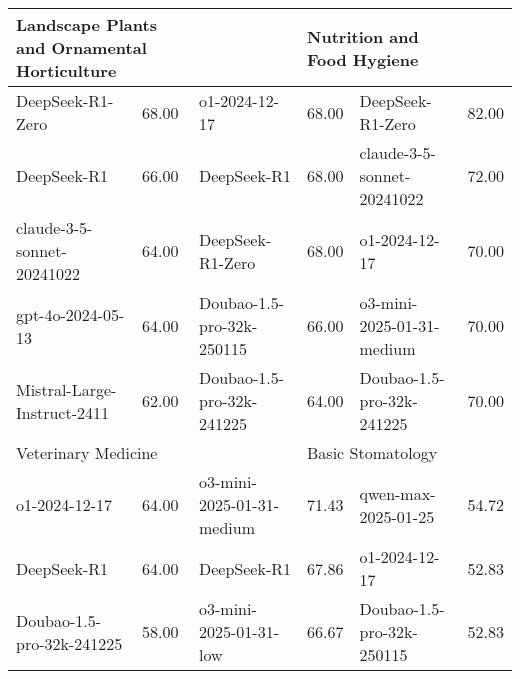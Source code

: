 {\begin{longtable}{p{4.2cm}>{\centering\arraybackslash} p{0.8cm}|p{4.2cm} >{\centering\arraybackslash} p{0.8cm}|p{4.2cm} >{\centering\arraybackslash} p{0.8cm}}
\hline
\multicolumn{2}{p{5.15cm}|}{\cellcolor{teal!10} \centering Landscape Plants and Ornamental Horticulture} & \multicolumn{2}{p{5.15cm}|}{\cellcolor{blue!10} \centering Poromechanics and Reservoir Physics} & \multicolumn{2}{p{5.15cm}}{\cellcolor{yellow!10} \centering Nutrition and Food Hygiene}\\
\hline
\cellcolor{teal!5} DeepSeek-R1-Zero & \cellcolor{teal!2}68.00 & \cellcolor{blue!5} o1-2024-12-17 & \cellcolor{blue!2} 68.00 & \cellcolor{yellow!5} DeepSeek-R1-Zero & \cellcolor{yellow!2} 82.00\\
\cellcolor{teal!5} DeepSeek-R1 & \cellcolor{teal!2}66.00 & \cellcolor{blue!5} DeepSeek-R1 & \cellcolor{blue!2} 68.00 & \cellcolor{yellow!5} claude-3-5-sonnet-20241022 & \cellcolor{yellow!2} 72.00\\
\cellcolor{teal!5} claude-3-5-sonnet-20241022 & \cellcolor{teal!2}64.00 & \cellcolor{blue!5} DeepSeek-R1-Zero & \cellcolor{blue!2} 68.00 & \cellcolor{yellow!5} o1-2024-12-17 & \cellcolor{yellow!2} 70.00\\
\cellcolor{teal!5} gpt-4o-2024-05-13 & \cellcolor{teal!2}64.00 & \cellcolor{blue!5} Doubao-1.5-pro-32k-250115 & \cellcolor{blue!2} 66.00 & \cellcolor{yellow!5} o3-mini-2025-01-31-medium & \cellcolor{yellow!2} 70.00\\
\cellcolor{teal!5} Mistral-Large-Instruct-2411 & \cellcolor{teal!2}62.00 & \cellcolor{blue!5} Doubao-1.5-pro-32k-241225 & \cellcolor{blue!2} 64.00 & \cellcolor{yellow!5} Doubao-1.5-pro-32k-241225 & \cellcolor{yellow!2} 70.00\\
\hline
\multicolumn{2}{p{5.15cm}|}{\cellcolor{teal!10} \centering Veterinary Medicine} & \multicolumn{2}{p{5.15cm}|}{\cellcolor{blue!10} \centering Engineering Fluid Mechanics} & \multicolumn{2}{p{5.15cm}}{\cellcolor{yellow!10} \centering Basic Stomatology}\\
\hline
\cellcolor{teal!5} o1-2024-12-17 & \cellcolor{teal!2}64.00 & \cellcolor{blue!5} o3-mini-2025-01-31-medium & \cellcolor{blue!2} 71.43 & \cellcolor{yellow!5} qwen-max-2025-01-25 & \cellcolor{yellow!2} 54.72\\
\cellcolor{teal!5} DeepSeek-R1 & \cellcolor{teal!2}64.00 & \cellcolor{blue!5} DeepSeek-R1 & \cellcolor{blue!2} 67.86 & \cellcolor{yellow!5} o1-2024-12-17 & \cellcolor{yellow!2} 52.83\\
\cellcolor{teal!5} Doubao-1.5-pro-32k-241225 & \cellcolor{teal!2}58.00 & \cellcolor{blue!5} o3-mini-2025-01-31-low & \cellcolor{blue!2} 66.67 & \cellcolor{yellow!5} Doubao-1.5-pro-32k-250115 & \cellcolor{yellow!2} 52.83\\

\end{longtable}}
